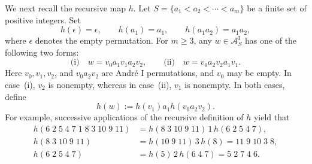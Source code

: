 \documentclass[12pt]{article}
\numberwithin{equation}{section}
\theoremstyle{plain}
\providecommand{\emptyword}{\epsilon}
\begin{document}
   			We next recall the recursive map \(h\). Let
   			\(S=\{a_1<a_2<\cdots<a_m\}\) be a finite set of positive integers. Set
   			\[
   			h(\emptyword)=\emptyword,
   			\qquad h(a_1)=a_1,
   			\qquad h(a_1a_2)=a_1a_2,
   			\]
   			where $\emptyword$ denotes the empty permutation. 
   			For \(m\geq3\), any \(w\in\mathcal{A}_S^{\mathrm{I}}\) has one of the
   			following two forms:
   			\[
   			\text{(i)}\quad w=v_0a_1v_1a_2v_2,
   			\qquad
   			\text{(ii)}\quad w=v_0a_2v_2a_1v_1.
   			\]
   			Here \(v_0,v_1,v_2\), and \(v_0a_2v_2\) are Andr\'e I permutations, 
   		and \(v_0\) may be empty. In case~(i),
   			\(v_2\) is nonempty, whereas in case~(ii), \(v_1\) is nonempty. In both
   			cases, define
   			\[
   			h(w):=h(v_1)a_1h(v_0a_2v_2).
   			\]
   			For example, 	successive applications of the recursive definition of \(h\) yield that
   			\[
   			\begin{aligned}
   				h(6\;2\;5\;4\;7\;1\;8\;3\;10\;9\;11)
   				&=h(8\;3\;10\;9\;11)\,1\,
   				h(6\;2\;5\;4\;7),\\
   				h(8\;3\;10\;9\;11)
   				&=h(10\;9\;11)\,3\,h(8)
   				=11\;9\;10\;3\;8,\\
   				h(6\;2\;5\;4\;7)
   				&=h(5)\,2\,h(6\;4\;7)
   				=5\;2\;7\;4\;6.
   			\end{aligned}
   			\]
   	
   			
   		 
   			
   			
   			
   			 
   		
   			
\end{document}
